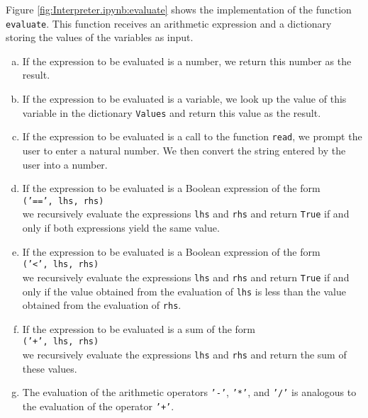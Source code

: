 Figure \ref{fig:Interpreter.ipynb:evaluate} shows the implementation of the function \texttt{evaluate}.
This function receives an arithmetic expression and a dictionary storing the
values of the variables as input.
\begin{enumerate}[(a)]
\item If the expression to be evaluated is a number, we return this number as the result.
\item If the expression to be evaluated is a variable, we look up the value of this
      variable in the dictionary \texttt{Values} and return this value as the result.
\item If the expression to be evaluated is a call to the function \texttt{read},
      we prompt the user to enter a natural number. We then convert the string entered by the user into a number.
\item If the expression to be evaluated is a Boolean expression of the form
      \\[0.2cm]
      \hspace*{1.3cm}
      \texttt{('==', lhs, rhs)}
      \\[0.2cm]
      we recursively evaluate the expressions \texttt{lhs} and \texttt{rhs} and return \texttt{True} if and only if
      both expressions yield the same value.
\item If the expression to be evaluated is a Boolean expression of the form
      \\[0.2cm]
      \hspace*{1.3cm}
      \texttt{('<', lhs, rhs)}
      \\[0.2cm]
      we recursively evaluate the expressions \texttt{lhs} and \texttt{rhs} and return \texttt{True} if and only if
      the value obtained from the evaluation of \texttt{lhs} is less than the
      value obtained from the evaluation of \texttt{rhs}.
\item If the expression to be evaluated is a sum of the form
      \\[0.2cm]
      \hspace*{1.3cm}
      \texttt{('+', lhs, rhs)}
      \\[0.2cm]
      we recursively evaluate the expressions \texttt{lhs} and \texttt{rhs} and return the sum of these
      values. 
\item The evaluation of the arithmetic operators \texttt{'-'}, \texttt{'*'}, and \texttt{'/'}
      is analogous to the evaluation of the operator \texttt{'+'}.
\end{enumerate}
\FloatBarrier

